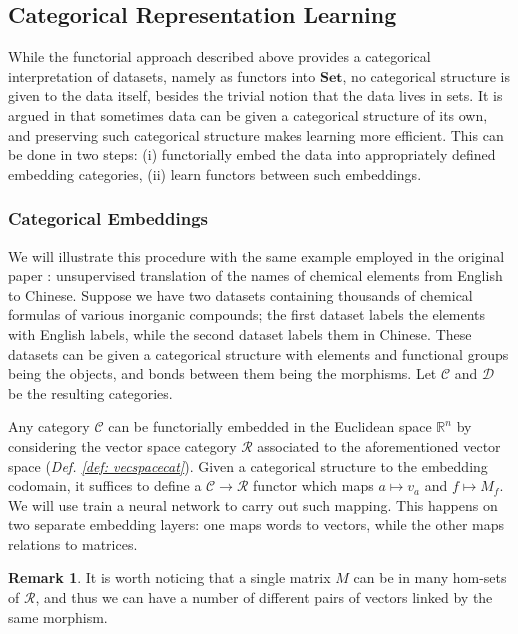 \documentclass[11pt,a4paper,openright,twoside]{report}
\theoremstyle{plain}
\theoremstyle{definition}
\newtheorem{remark}[proposition]{Remark}
\begin{document}
\subsection{Categorical Representation Learning}


While the functorial approach described above provides a categorical interpretation of datasets, namely as functors into $\mathbf{Set}$, no categorical structure is given to the data itself, besides the trivial notion that the data lives in sets. It is argued in \cite{sheshmani2021categorical} that sometimes data can be given a categorical structure of its own, and preserving such categorical structure makes learning more efficient. This can be done in two steps: (i) functorially embed the data into appropriately defined embedding categories, (ii) learn functors between such embeddings. 


\subsubsection{Categorical Embeddings}

We will illustrate this procedure with the same example employed in the original paper \cite{sheshmani2021categorical}: unsupervised translation of the names of chemical elements from English to Chinese. Suppose we have two datasets containing thousands of chemical formulas of various inorganic compounds; the first dataset labels the elements with English labels, while the second dataset labels them in Chinese. These datasets can be given a categorical structure with elements and functional groups being the objects, and bonds between them being the morphisms. Let $\mathcal{C}$ and $\mathcal{D}$ be the resulting categories.


Any category $\mathcal{C}$ can be functorially embedded in the Euclidean space $\mathbb{R}^n$ by considering the vector space category $\mathcal{R}$ associated to the aforementioned vector space (\textit{Def. \ref{def: vecspacecat}}). Given a categorical structure to the embedding codomain, it suffices to define a $\mathcal{C} \to \mathcal{R}$ functor which maps $a \mapsto v_a$ and $f \mapsto M_f$. We will use train a neural network to carry out such mapping. This happens on two separate embedding layers: one maps words to vectors, while the other maps relations to matrices.  

\begin{remark}
  It is worth noticing that a single matrix $M$ can be in many hom-sets of $\mathcal{R}$, and thus we can have a number of different pairs of vectors linked by the same morphism.
\end{remark}
\end{document}
